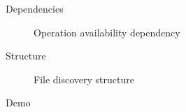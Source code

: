 



\begin{frame}{Dependencies}
  \begin{figure}
    \centering
    
    \caption{Operation availability dependency}
    \label{fig:operation-dependence}
  \end{figure}
\end{frame}

\begin{frame}{Structure}
  \begin{figure}
    \centering
    
    \caption{File discovery structure}
    \label{fig:structure}
  \end{figure}

\end{frame}

\begin{frame}[standout]
  Demo
\end{frame}